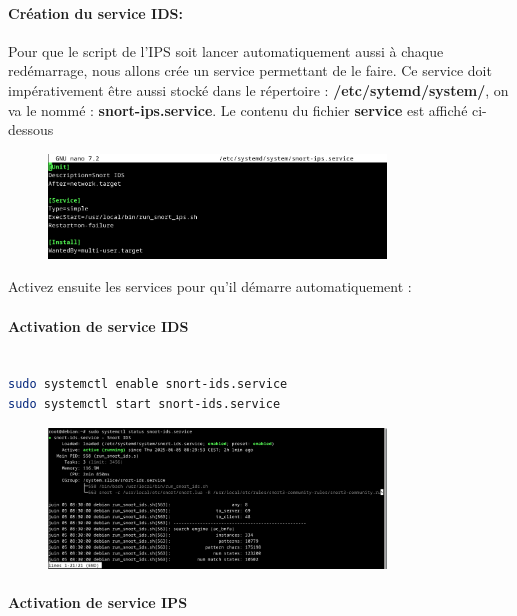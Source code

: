 \documentclass[12pt]{article}
\begin{document}
\paragraph{Création du service IDS:}
Pour que le script de l'IPS soit lancer automatiquement aussi à chaque redémarrage, nous allons crée un service permettant de le faire. Ce service doit impérativement être aussi stocké dans le répertoire : \textbf{/etc/sytemd/system/}, on va le nommé : \textbf{snort-ips.service}. Le contenu du fichier \textbf{service} est affiché ci-dessous
\begin{figure}[H] 
    \centering
    \includegraphics[width=0.8\textwidth]{captures/image2.png}
    \label{fig:mon_image}
\end{figure}
Activez ensuite les services pour qu’il démarre automatiquement :
\paragraph{Activation de service IDS}

\begin{lstlisting}[language=bash]

sudo systemctl enable snort-ids.service
sudo systemctl start snort-ids.service
\end{lstlisting}
\begin{figure}[H] 
    \centering
    \includegraphics[width=0.8\textwidth]{captures/image6.png}
    \label{fig:mon_image}
\end{figure}
\paragraph{Activation de service IPS}
\end{document}
